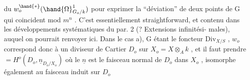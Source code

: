 du  $w_o^{\hand{*}}(\hand{\Omega}^1_{G_o/k})$ pour exprimer la ``déviation'' de deux points de G qui
coincident mod $m^n$ . C'est essentiellement straightforward, et contenu
dans les développements systématiques du par. 2 (? Extensions infinitési-%
males), auquel on pourrait renvoyer ici. Dans le cas a), G étant le
foncteur $\mathrm{Div}_{X/S}$ , $w_o$ correspond donc à un diviseur de Cartier  $D_o$ sur
$X_o = X\otimes_A k$ , et il faut prendre \hand{$\Omega$}$= H^o(D_o, \underline{n}_{D_o/X_o})$ où le $\underline{n}$ est le
faisceau normal de $D_o$ dans $X_o$ , isomorphe également au faisceau induit
sur $D_o$

